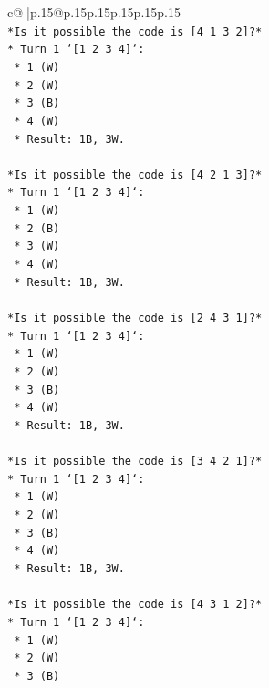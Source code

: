 \documentclass{article}
\begin{document}
{\begin{supertabular}{c@{$\;$}|p{.15\linewidth}@{}p{.15\linewidth}p{.15\linewidth}p{.15\linewidth}p{.15\linewidth}p{.15\linewidth}}
{{{\\ 
\texttt{*Is it possible the code is {[}4 1 3 2{]}?*} \\
\texttt{*   Turn 1 `{[}1 2 3 4{]}`:} \\
\texttt{    *   1 (W)} \\
\texttt{    *   2 (W)} \\
\texttt{    *   3 (B)} \\
\texttt{    *   4 (W)} \\
\texttt{    *   Result: 1B, 3W.} \\
\\ 
\texttt{*Is it possible the code is {[}4 2 1 3{]}?*} \\
\texttt{*   Turn 1 `{[}1 2 3 4{]}`:} \\
\texttt{    *   1 (W)} \\
\texttt{    *   2 (B)} \\
\texttt{    *   3 (W)} \\
\texttt{    *   4 (W)} \\
\texttt{    *   Result: 1B, 3W.} \\
\\ 
\texttt{*Is it possible the code is {[}2 4 3 1{]}?*} \\
\texttt{*   Turn 1 `{[}1 2 3 4{]}`:} \\
\texttt{    *   1 (W)} \\
\texttt{    *   2 (W)} \\
\texttt{    *   3 (B)} \\
\texttt{    *   4 (W)} \\
\texttt{    *   Result: 1B, 3W.} \\
\\ 
\texttt{*Is it possible the code is {[}3 4 2 1{]}?*} \\
\texttt{*   Turn 1 `{[}1 2 3 4{]}`:} \\
\texttt{    *   1 (W)} \\
\texttt{    *   2 (W)} \\
\texttt{    *   3 (B)} \\
\texttt{    *   4 (W)} \\
\texttt{    *   Result: 1B, 3W.} \\
\\ 
\texttt{*Is it possible the code is {[}4 3 1 2{]}?*} \\
\texttt{*   Turn 1 `{[}1 2 3 4{]}`:} \\
\texttt{    *   1 (W)} \\
\texttt{    *   2 (W)} \\
\texttt{    *   3 (B)} \\
}}}
\end{supertabular}}
\end{document}
